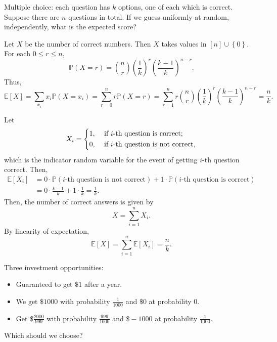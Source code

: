 \begin{eg}
    Multiple choice: each question has \(k\) options, one of each which is correct. Suppose there are \(n\) questions in total. If we guess uniformly at random, independently, what is the expected score?  
\end{eg}

\begin{answer}      
    Let \(X\) be the number of correct numbers. Then \(X\) takes values in \([n] \cup \left\{ 0 \right\} \). For each \(0 \le r \le n\), 
    \[
        \mathbb{P} (X = r) = \binom{n}{r} \left( \frac{1}{k} \right)^r \left( \frac{k-1}{k} \right)^{n-r}.  
    \]
    Thus, 
    \[
        \mathbb{E} [X] = \sum_{x_i} x_i \mathbb{P} (X = x_i) = \sum_{r = 0}^n r \mathbb{P} (X = r) = \sum_{r = 1}^n r \binom{n}{r} \left( \frac{1}{k} \right)^r \left( \frac{k-1}{k} \right)^{n-r} = \frac{n}{k}.   
    \]    
\end{answer}        

\begin{answer}
    Let 
    \[
        X_i = \begin{dcases}
            1, &\text{ if } i \text{-th question is correct}  ;\\
            0, &\text{ if } i \text{-th question is not correct} ,
        \end{dcases}
    \]
    which is the indicator random variable for the event of getting \(i\)-th question correct. Then,
    \begin{align*}
        \mathbb{E} [X_i] &= 0 \cdot \mathbb{P} (i\text{-th question is not correct} ) + 1 \cdot \mathbb{P} (i\text{-th question is correct} ) \\
        &= 0 \cdot \frac{k-1}{k} + 1 \cdot \frac{1}{k} = \frac{1}{k}.
    \end{align*}
    Then, the number of correct answers is given by 
    \[
        X = \sum_{i=1}^n X_i. 
    \]
    By linearity of expectation,
    \[
        \mathbb{E} [X] = \sum_{i=1}^n \mathbb{E} [X_i] = \frac{n}{k}. 
    \]
\end{answer}

\begin{question}
    Three investment opportunities: 
    \begin{itemize}
        \item [1.] Guaranteed to get \(\$ 1\) after a year. 
        \item [2.] We get \(\$ 1000\) with probability \(\frac{1}{1000}\) and \(\$ 0\) at probability \(0\). 
        \item [3.] Get \(\$ \frac{2000}{999}\) with probability \(\frac{999}{1000}\) and \(\$ -1000\) at probability \(\frac{1}{1000}\).        
    \end{itemize}
    Which should we choose?
\end{question}